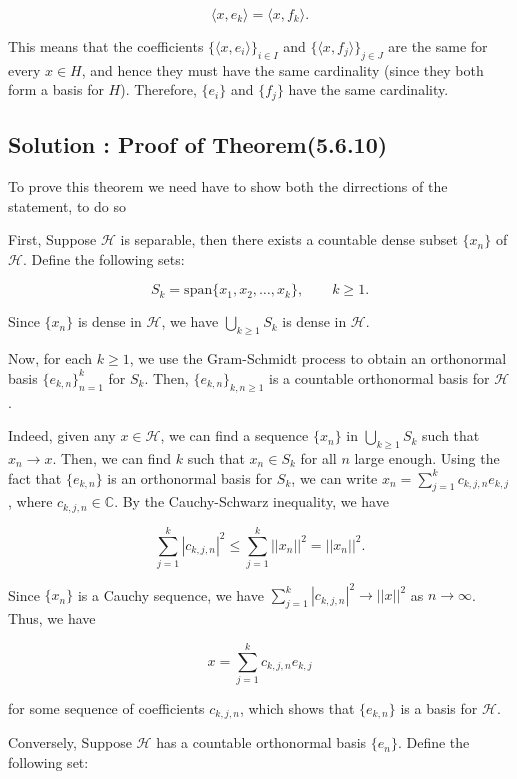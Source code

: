 \documentclass[12pt, a4paper]{article} %
\begin{document}
        \[\langle x,e_k\rangle=\langle x,f_k\rangle.\]

        This means that the coefficients $\{\langle x,e_i\rangle\}_{i\in I}$ and $\{\langle x,f_j\rangle\}_{j\in J}$ are the same for every $x\in H$, and hence they must have the same cardinality (since they both form a basis for $H$). Therefore, $\{e_i\}$ and $\{f_j\}$ have the same cardinality.

    \subsection{Solution : Proof of Theorem(5.6.10)}

        To prove this theorem we need have to show both the dirrections of the statement, to do so 

        First, Suppose $\mathcal{H}$ is separable, then there exists a countable dense subset $\{x_n\}$ of $\mathcal{H}$. Define the following sets:

        $$S_k = \text{span}\{x_1, x_2, \ldots, x_k\}, \qquad k \geq 1.$$

        Since $\{x_n\}$ is dense in $\mathcal{H}$, we have $\bigcup_{k \geq 1} S_k$ is dense in $\mathcal{H}$. 

        Now, for each $k \geq 1$, we use the Gram-Schmidt process to obtain an orthonormal basis $\{e_{k,n}\}_{n=1}^k$ for $S_k$. Then, $\{e_{k,n}\}_{k,n \geq 1}$ is a countable orthonormal basis for $\mathcal{H}$.

        Indeed, given any $x \in \mathcal{H}$, we can find a sequence $\{x_n\}$ in $\bigcup_{k \geq 1} S_k$ such that $x_n \to x$. Then, we can find $k$ such that $x_n \in S_k$ for all $n$ large enough. Using the fact that $\{e_{k,n}\}$ is an orthonormal basis for $S_k$, we can write $x_n = \sum_{j=1}^k c_{k,j,n} e_{k,j}$, where $c_{k,j,n} \in \mathbb{C}$. By the Cauchy-Schwarz inequality, we have

        $$\sum_{j=1}^k |c_{k,j,n}|^2 \leq \sum_{j=1}^k ||x_n||^2 = ||x_n||^2.$$ 

        Since $\{x_n\}$ is a Cauchy sequence, we have $\sum_{j=1}^k |c_{k,j,n}|^2 \to ||x||^2$ as $n \to \infty$. Thus, we have

        $$x = \sum_{j=1}^k c_{k,j,n} e_{k,j}$$

        for some sequence of coefficients $c_{k,j,n}$, which shows that $\{e_{k,n}\}$ is a basis for $\mathcal{H}$.

        Conversely, Suppose $\mathcal{H}$ has a countable orthonormal basis $\{e_n\}$. Define the following set:
\end{document}
